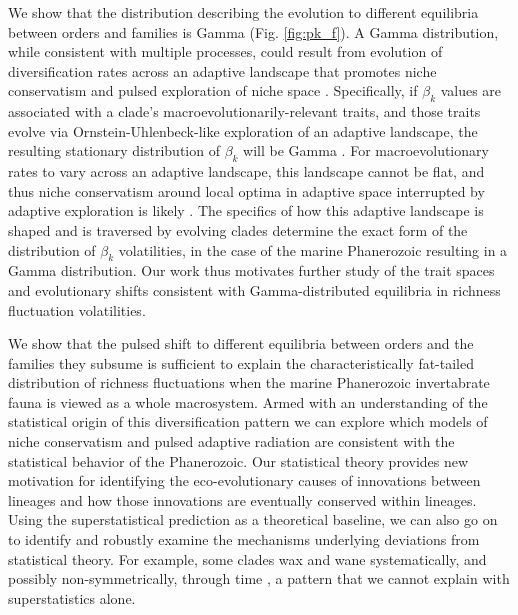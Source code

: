 \documentclass[12pt]{article}
\let\citep=\cite
\begin{document}
We show that the distribution describing the evolution to different
equilibria between orders and families is Gamma (Fig. \ref{fig:pk_f}).
A Gamma distribution, while consistent with multiple processes, could
result from evolution of diversification rates across an adaptive
landscape that promotes niche conservatism and pulsed exploration of
niche space \citep{cir1985}.  Specifically, if $\beta_k$ values are
associated with a clade's macroevolutionarily-relevant traits, and
those traits evolve via Ornstein-Uhlenbeck-like exploration of an
adaptive landscape, the resulting stationary distribution of $\beta_k$
will be Gamma \citep{cir1985, butler2004}.  For macroevolutionary
rates to vary across an adaptive landscape, this landscape cannot be
flat, and thus niche conservatism around local optima in adaptive
space interrupted by adaptive exploration is likely
\citep{newman1985adaptive, gavrilets2004book}. The specifics of how
this adaptive landscape is shaped and is traversed by evolving clades
determine the exact form of the distribution of $\beta_k$
volatilities, in the case of the marine Phanerozoic resulting in a
Gamma distribution. Our work thus motivates further study of the trait
spaces and evolutionary shifts consistent with Gamma-distributed
equilibria in richness fluctuation volatilities.

We show that the pulsed shift to different equilibria between orders
and the families they subsume is sufficient to explain the
characteristically fat-tailed distribution of richness fluctuations
when the marine Phanerozoic invertabrate fauna is viewed as a whole
macrosystem.  Armed with an understanding of the statistical origin of
this diversification pattern we can explore which models of niche
conservatism and pulsed adaptive radiation are consistent with the
statistical behavior of the Phanerozoic. Our statistical theory
provides new motivation for identifying the eco-evolutionary causes of
innovations between lineages and how those innovations are eventually
conserved within lineages. Using the superstatistical prediction as a
theoretical baseline, we can also go on to identify and robustly
examine the mechanisms underlying deviations from statistical
theory. For example, some clades wax and wane systematically, and
possibly non-symmetrically, through time \citep{liow2007,
  foote2008paleobiol, quental2013}, a pattern that we cannot explain
with superstatistics alone.
\end{document}
